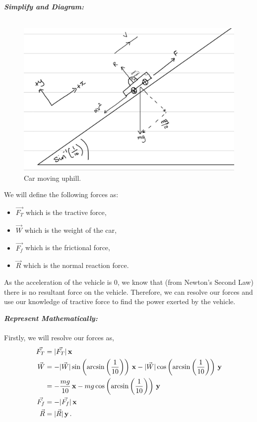 \begin{subquestions}
\textbf{\textit{Simplify and Diagram:}} \\ \\	
\begin{figure}[H]
	\begin{center}
		\includegraphics[scale=0.25]{../2009/figures/2009q5-1}
		\caption{\label{2009:q5:Diagram1} Car moving uphill.}
	\end{center}
\end{figure}
We will define the following forces as:
\begin{itemize}
	\item $\vec{F_T}$ which is the tractive force,
	\item $\vec{W}$ which is the weight of the car,
	\item $\vec{F_f}$ which is the frictional force,
	\item $\vec{R}$ which is the normal reaction force.
\end{itemize}
As the acceleration of the vehicle is 0, we know that (from Newton's Second Law) there is no resultant force on the vehicle. Therefore, we can resolve our forces and use our knowledge of tractive force to find the power exerted by the vehicle.




\textbf{\textit{Represent Mathematically:}} \\ \\
Firstly, we will resolve our forces as,
\begin{align}
	\vec{F_T} & = |\vec{F_T}|\,\mathbf{x} \\
	\vec{W} & = -|\vec{W}|\sin\left(\arcsin\left(\frac{1}{10}\right)\right)\,\mathbf{x} -|\vec{W}|\cos\left(\arcsin\left(\frac{1}{10}\right)\right)\,\mathbf{y} \nonumber \\
	        & = -\frac{mg}{10}\,\mathbf{x} - mg\cos\left(\arcsin\left(\frac{1}{10}\right)\right)\,\mathbf{y} \\
	\vec{F_f} & = -|\vec{F_f}|\,\mathbf{x} \\
	\vec{R} & = |\vec{R}|\,\mathbf{y} \,.
\end{align}


\end{subquestions}
